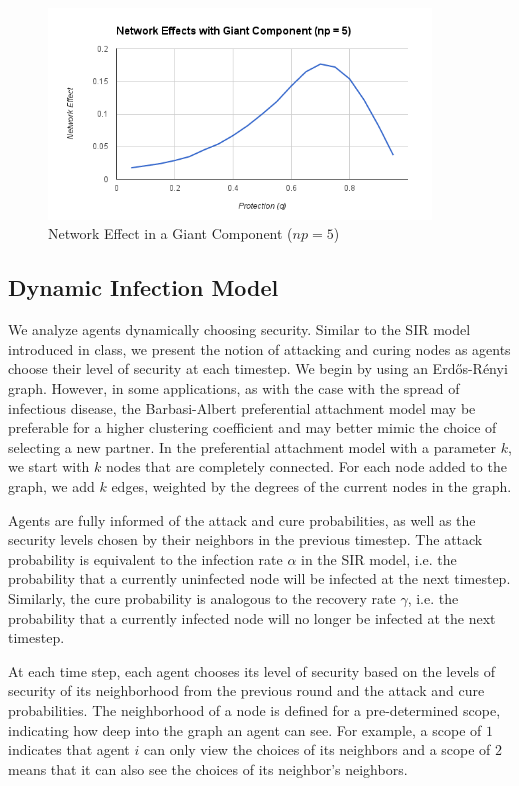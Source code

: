 \documentclass{article}
\theoremstyle{plain}
\begin{document}
\begin{figure}[h!]
  \centering
  \includegraphics[width=4in]{network_effects_np5.png}
  \caption{Network Effect in a Giant Component ($np = 5$)}
  \label{network_effects_np5.fig}
\end{figure}

\subsection{Dynamic Infection Model}

We analyze agents dynamically choosing security. Similar to the SIR model introduced in class, we present the notion of attacking and curing nodes as agents choose their level of security at each timestep. We begin by using an Erd\H{o}s-R\'{e}nyi graph. However, in some applications, as with the case with the spread of infectious disease, the Barbasi-Albert preferential attachment model may be preferable for a higher clustering coefficient and may better mimic the choice of selecting a new partner. In the preferential attachment model with a parameter $k$, we start with $k$ nodes that are completely connected. For each node added to the graph, we add $k$ edges, weighted by the degrees of the current nodes in the graph.

Agents are fully informed of the attack and cure probabilities, as well as the security levels chosen by their neighbors in the previous timestep. The attack probability is equivalent to the infection rate $\alpha$ in the SIR model, i.e. the probability that a currently uninfected node will be infected at the next timestep. Similarly, the cure probability is analogous to the recovery rate $\gamma$, i.e. the probability that a currently infected node will no longer be infected at the next timestep.

At each time step, each agent chooses its level of security based on the levels of security of its neighborhood from the previous round and the attack and cure probabilities. The neighborhood of a node is defined for a pre-determined scope, indicating how deep into the graph an agent can see. For example, a scope of $1$ indicates that  agent $i$ can only view the choices of its neighbors and a scope of $2$ means that it can also see the choices of its neighbor's neighbors.
\end{document}
